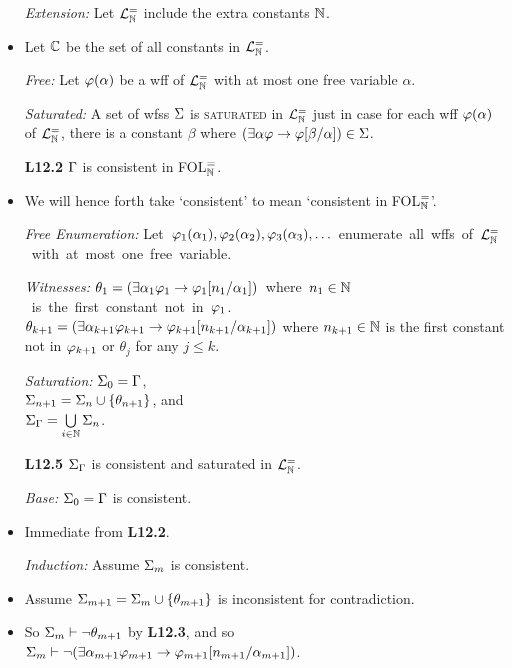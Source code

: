 \documentclass[a4paper, 11pt]{article} %
\begin{document}
\begin{itemize}
  \item[\it Extension:] Let $\mathcal{L}^{=}_{\mathbb{N}}$ include the extra constants $\mathbb{N}$.
    \item Let $\mathbb{C}$ be the set of all constants in $\mathcal{L}^{=}_{\mathbb{N}}$.
  \item[\it Free:] Let $\varphi(\alpha)$ be a wff of $\mathcal{L}^{=}_{\mathbb{N}}$ with at most one free variable $\alpha$.
  \item[\it Saturated:] A set of wfss $\Sigma$ is \textsc{saturated} in $\mathcal{L}^{=}_{\mathbb{N}}$ just in case for each wff $\varphi(\alpha)$ of $\mathcal{L}^{=}_{\mathbb{N}}$, there is a constant $\beta$ where $(\exists \alpha\varphi \rightarrow \varphi[\beta/\alpha])\in\Sigma$.
  \item[\bf L12.2] $\Gamma$ is consistent in FOL$^=_{\mathbb{N}}$.
    \item We will hence forth take `consistent' to mean `consistent in FOL$^=_{\mathbb{N}}$'.
  \item[\it Free Enumeration:] \mbox{Let $\varphi_1(\alpha_1),\varphi_2(\alpha_2),\varphi_3(\alpha_3),\ldots$ enumerate all wffs of $\mathcal{L}^{=}_{\mathbb{N}}$ with at most one free variable.}
  \item[\it Witnesses:] \mbox{$\theta_1=(\exists \alpha_1\varphi_1\rightarrow \varphi_1[n_1/\alpha_1])$ where $n_1\in\mathbb{N}$ is the first constant not in $\varphi_1$.}\vspace{.05in}\\
    $\theta_{k+1}=(\exists \alpha_{k+1}\varphi_{k+1}\rightarrow \varphi_{k+1}[n_{k+1}/\alpha_{k+1}])$  where $n_{k+1}\in\mathbb{N}$ is the first constant not in $\varphi_{k+1}$ or $\theta_j$ for any $j\leq k$.
  \item[\it Saturation:]
    $\Sigma_0 = \Gamma$,\\
    $\Sigma_{n+1} = \Sigma_n\cup\lbrace\theta_{n+1}\rbrace$, and\\
    $\Sigma_{\Gamma} = \bigcup\limits_{i\in\mathbb{N}}\Sigma_n$.
  \item[\bf L12.5] $\Sigma_{\Gamma}$ is consistent and saturated in $\mathcal{L}^{=}_{\mathbb{N}}$.
    \item[\it Base:] $\Sigma_0 = \Gamma$ is consistent. 
      \item Immediate from \textbf{L12.2}.
    \item[\it Induction:] Assume $\Sigma_m$ is consistent. 
    \item Assume $\Sigma_{m+1} = \Sigma_m \cup \lbrace\theta_{m+1}\rbrace$ is inconsistent for contradiction.
    \item So $\Sigma_m \vdash \neg\theta_{m+1}$ by \textbf{L12.3}, and so $\Sigma_m \vdash \neg (\exists \alpha_{m+1}\varphi_{m+1}\rightarrow \varphi_{m+1}[n_{m+1}/\alpha_{m+1}])$.

\end{itemize}
\end{document}
